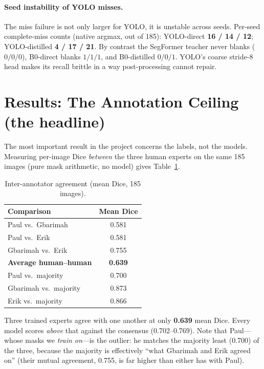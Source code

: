 \documentclass[11pt]{article}
\newcommand{\best}[1]{\textbf{#1}}
\begin{document}
\paragraph{Seed instability of YOLO misses.} The miss failure is not only larger
for YOLO, it is unstable across seeds. Per-seed complete-miss counts (native
argmax, out of 185): YOLO-direct \textbf{16 / 14 / 12}; YOLO-distilled
\textbf{4 / 17 / 21}. By contrast the SegFormer teacher never blanks
($0/0/0$), B0-direct blanks $1/1/1$, and B0-distilled $0/0/1$. YOLO's coarse
stride-8 head makes its recall brittle in a way post-processing cannot repair.

\section{Results: The Annotation Ceiling (the headline)}
\label{sec:ceiling}
The most important result in the project concerns the labels, not the models.
Measuring per-image Dice \emph{between} the three human experts on the same 185
images (pure mask arithmetic, no model) gives Table~\ref{tab:ceiling}.

\begin{table}[h]
\centering
\caption{Inter-annotator agreement (mean Dice, 185 images).}
\label{tab:ceiling}
\begin{tabular}{lc}
\toprule
Comparison & Mean Dice \\
\midrule
Paul vs.\ Gbarimah & 0.581 \\
Paul vs.\ Erik     & 0.581 \\
Gbarimah vs.\ Erik & 0.755 \\
\textbf{Average human--human} & \best{0.639} \\
\midrule
Paul vs.\ majority     & 0.700 \\
Gbarimah vs.\ majority & 0.873 \\
Erik vs.\ majority     & 0.866 \\
\bottomrule
\end{tabular}
\end{table}

Three trained experts agree with one another at only \textbf{0.639} mean Dice.
Every model scores \emph{above} that against the consensus (0.702--0.769). Note
that Paul---whose masks we \emph{train on}---is the outlier: he matches the
majority least (0.700) of the three, because the majority is effectively ``what
Gbarimah and Erik agreed on'' (their mutual agreement, 0.755, is far higher than
either has with Paul).
\end{document}
